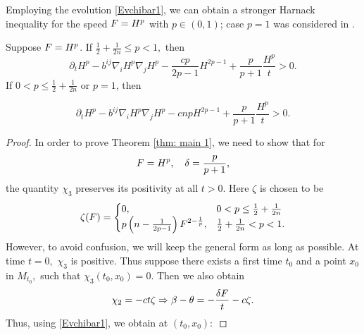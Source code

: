 \documentclass{amsart}
\begin{document}
Employing the evolution \cref{Evchibar1}, we can obtain a stronger Harnack inequality for the speed \(F = H^{p}\) with \(p \in (0,1)\); case $p=1$ was considered in \cite{BryanIvaki:08/2015}.
\begin{theorem} \label{thm: main 1}
Suppose \(F = H^{p}\). If $\frac{1}{2}+\frac{1}{2n}\leq {p}< 1,$ then
\[
\partial_t H^{p} - b^{ij}\nabla_iH^{p}\nabla_jH^{p} - \frac{c {p}}{2{p}-1}H^{2{p}-1} + \frac{{p}}{{p}+1} \frac{H^{p}}{t} > 0.
\]
If $0<{p}\leq \frac{1}{2} + \frac{1}{2n}$ or $p=1$, then

\[
\partial_t H^{p} - b^{ij}\nabla_iH^{p}\nabla_jH^{p} - c n{p}H^{2{p}-1} + \frac{{p}}{{p}+1} \frac{H^{p}}{t} > 0.
\]
\end{theorem}
\begin{proof}
In order to prove Theorem \ref{thm: main 1}, we need to show that for
$$F=H^{p},\quad \delta=\frac{p}{p+1},$$
the quantity $\chi_3$ preserves its positivity at all $t>0.$ Here $\zeta$ is chosen to be
$$\zeta(F)=\begin{cases} 0, &0<p\leq \frac{1}{2}+\frac{1}{2n}\\
                    p\left(n-\frac{1}{2p-1}\right)F^{2-\frac{1}{p}}, &\frac{1}{2}+\frac{1}{2n}<p< 1.\end{cases}$$
However, to avoid confusion, we will keep the general form as long as possible.
At time $t=0,$ $\chi_3$ is positive.
Thus suppose there exists a first time $t_0$ and a point $x_0$ in $M_{t_0},$ such that $\chi_3(t_0,x_0)=0.$
Then we also obtain
$$\chi_2=-ct\zeta\Rightarrow \beta-\theta=-\frac{\delta F}{t}-c\zeta.$$
Thus, using \eqref{Evchibar1}, we obtain at $(t_0,x_0)\colon$


\end{proof}
\end{document}
